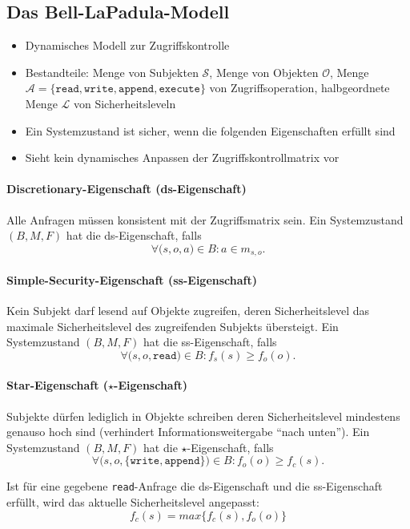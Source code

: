 \subsection{Das Bell-LaPadula-Modell}
\begin{itemize}
	\item Dynamisches Modell zur Zugriffskontrolle
	\item Bestandteile: Menge von Subjekten \(\mathcal{S}\), Menge von Objekten \(\mathcal{O}\), Menge \(\mathcal{A} = \{\texttt{read},\texttt{write},\texttt{append},\texttt{execute}\}\) von Zugriffsoperation, halbgeordnete Menge \(\mathcal{L}\) von Sicherheitsleveln
	\item Ein Systemzustand ist sicher, wenn die folgenden Eigenschaften erfüllt sind
	\item Sieht kein dynamisches Anpassen der Zugriffskontrollmatrix vor
\end{itemize}

\paragraph{Discretionary-Eigenschaft (ds-Eigenschaft)}
Alle Anfragen müssen konsistent mit der Zugriffsmatrix sein. Ein Systemzustand \((B,M,F)\) hat die ds-Eigenschaft, falls
\[\forall\big(s,o,a\big) \in B : a \in m_{s,o}.\]

\paragraph{Simple-Security-Eigenschaft (ss-Eigenschaft)}
Kein Subjekt darf lesend auf Objekte zugreifen, deren Sicherheitslevel das maximale Sicherheitslevel des zugreifenden Subjekts übersteigt. Ein Systemzustand \((B,M,F)\) hat die ss-Eigenschaft, falls
\[\forall\big(s,o,\texttt{read}\big) \in B : f_s(s) \geq f_o(o).\]

\paragraph{Star-Eigenschaft (\(\star\)-Eigenschaft)}
Subjekte dürfen lediglich in Objekte schreiben deren Sicherheitslevel mindestens genauso hoch sind (verhindert Informationsweitergabe "`nach unten"'). Ein Systemzustand \((B,M,F)\) hat die \(\star\)-Eigenschaft, falls
\[\forall\big(s,o,\{\texttt{write},\texttt{append}\}\big) \in B : f_o(o) \geq f_c(s).\]

Ist für eine gegebene \texttt{read}-Anfrage die ds-Eigenschaft und die ss-Eigenschaft erfüllt, wird das aktuelle Sicherheitslevel angepasst:
\[f_c(s) = max\big\{f_c(s),f_o(o)\big\}\]

